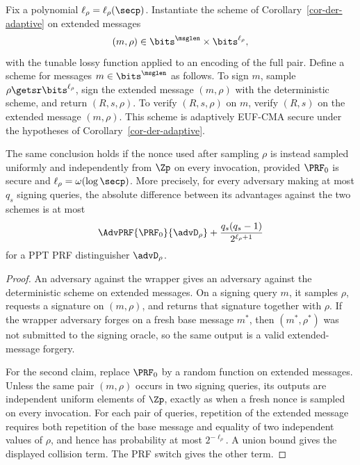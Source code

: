
\begin{corollary} \label{cor-randomized-wrapper}
Fix a polynomial $\ell_\rho=\ell_\rho(\secp)$. Instantiate the scheme of Corollary~\ref{cor-der-adaptive} on extended messages
$$
(m,\rho)\in\bits^{\msglen}\times\bits^{\ell_\rho},
$$
with the tunable lossy function applied to an encoding of the full pair. Define a scheme for messages $m\in\bits^{\msglen}$ as follows. To sign $m$, sample $\rho\getsr\bits^{\ell_\rho}$, sign the extended message $(m,\rho)$ with the deterministic scheme, and return $(R,s,\rho)$. To verify $(R,s,\rho)$ on $m$, verify $(R,s)$ on the extended message $(m,\rho)$. This scheme is adaptively EUF-CMA secure under the hypotheses of Corollary~\ref{cor-der-adaptive}.

The same conclusion holds if the nonce used after sampling $\rho$ is instead sampled uniformly and independently from $\Zp$ on every invocation, provided $\PRF_0$ is secure and $\ell_\rho=\omega(\log\secp)$. More precisely, for every adversary making at most $q_s$ signing queries, the absolute difference between its advantages against the two schemes is at most
$$
\AdvPRF{\PRF_0}{\advD_\rho}
+\frac{q_s(q_s-1)}{2^{\ell_\rho+1}}
$$
for a PPT PRF distinguisher $\advD_\rho$.
\end{corollary}

\begin{proof}
An adversary against the wrapper gives an adversary against the deterministic scheme on extended messages. On a signing query $m$, it samples $\rho$, requests a signature on $(m,\rho)$, and returns that signature together with $\rho$. If the wrapper adversary forges on a fresh base message $m^*$, then $(m^*,\rho^*)$ was not submitted to the signing oracle, so the same output is a valid extended-message forgery.

For the second claim, replace $\PRF_0$ by a random function on extended messages. Unless the same pair $(m,\rho)$ occurs in two signing queries, its outputs are independent uniform elements of $\Zp$, exactly as when a fresh nonce is sampled on every invocation. For each pair of queries, repetition of the extended message requires both repetition of the base message and equality of two independent values of $\rho$, and hence has probability at most $2^{-\ell_\rho}$. A union bound gives the displayed collision term. The PRF switch gives the other term.
\end{proof}
